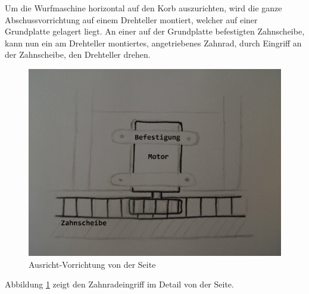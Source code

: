 Um die Wurfmaschine horizontal auf den Korb auszurichten, wird die ganze Abschussvorrichtung auf einem Drehteller montiert, welcher auf einer Grundplatte gelagert liegt. An einer auf der Grundplatte befestigten Zahnscheibe, kann nun ein am Drehteller montiertes, angetriebenes Zahnrad, durch Eingriff an der Zahnscheibe, den Drehteller drehen.

\begin{figure}[h!]
	\label{fig:ausricht-vorrichtung-von-der-seite}
	\centering
	\includegraphics[scale=0.35]{../../fig/Ausrichtvorrichtung_Detail.jpg}
	\caption{Ausricht-Vorrichtung von der Seite}
\end{figure}
Abbildung \ref{fig:ausricht-vorrichtung-von-der-seite} zeigt den Zahnradeingriff im Detail von der Seite.
